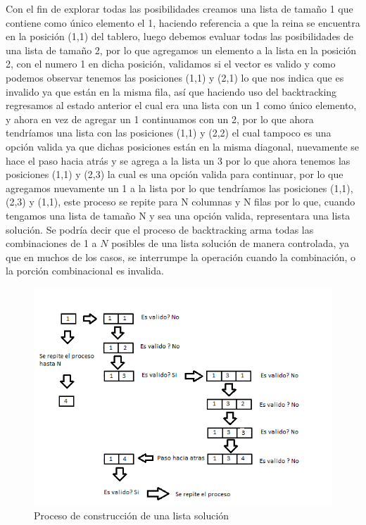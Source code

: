 \documentclass[12pt,a4paper]{article}
\begin{document}
\begin{enumerate}
Con el fin de explorar todas las posibilidades creamos una lista de tamaño 1 que contiene como único elemento el 1, haciendo referencia a que la reina se encuentra en la posición (1,1) del tablero, luego debemos evaluar todas las posibilidades de una lista de tamaño 2, por lo que agregamos un elemento a la lista en la posición 2, con el numero 1 en dicha posición,  validamos si el vector es valido y como podemos observar tenemos las posiciones (1,1) y (2,1) lo que nos indica que es invalido ya que están en la misma fila, así que haciendo uso del backtracking regresamos al estado anterior el cual era una lista con un 1 como único elemento, y ahora en vez de agregar un 1 continuamos con un 2, por lo que ahora tendríamos una lista con las posiciones (1,1) y (2,2) el cual tampoco es una opción valida ya que dichas posiciones están en la misma diagonal, nuevamente se hace el paso hacia atrás y se agrega a la lista un 3 por lo que ahora tenemos las posiciones (1,1) y (2,3) la cual es una opción valida para continuar, por lo que agregamos nuevamente un 1 a la lista por lo que tendríamos las posiciones (1,1), (2,3) y (1,1), este proceso se repite para N columnas y N filas por lo que, cuando tengamos una lista de tamaño N y sea una opción valida, representara una lista solución. Se podría decir que el proceso de backtracking arma todas las combinaciones de 1 a $N$ posibles de una lista solución de manera controlada, ya que en muchos de los casos, se interrumpe la operación cuando la combinación, o la porción combinacional es invalida.

\begin{figure}[htp]
\centering
\graphicspath{ {imagenes/} }
\includegraphics[scale=0.60]{analisisv.png}
\caption{Proceso de construcción de una lista solución}
\label{foto}
\end{figure}


\end{enumerate}
\end{document}
